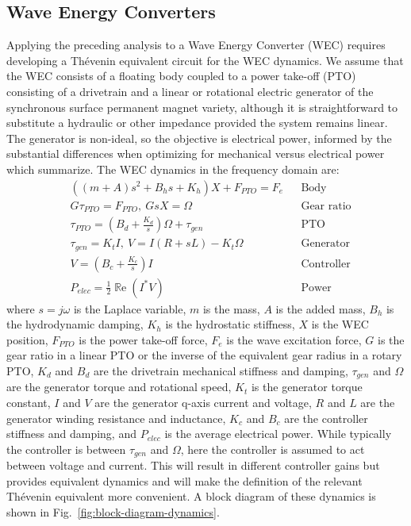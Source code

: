 \documentclass{ifacconf}
\renewcommand{\Re}{\operatorname{\mathbb{R}e}}
\begin{document}
\subsection{Wave Energy Converters}
Applying the preceding analysis to a Wave Energy Converter (WEC) requires developing a Thévenin equivalent circuit for the WEC dynamics. We assume that the WEC consists of a floating body coupled to a power take-off (PTO) consisting of a drivetrain and a linear or rotational electric generator of the synchronous surface permanent magnet variety, although it is straightforward to substitute a hydraulic or other impedance provided the system remains linear. The generator is non-ideal, so the objective is electrical power, informed by the substantial differences when optimizing for mechanical versus electrical power which \cite{coe_useful_2023} summarize. The WEC dynamics in the frequency domain are:
\begin{equation}\label{eq:wec-dynamics}
\begin{aligned}
    &((m+A)s^2 + B_h s + K_h) X + F_{PTO} = F_e &&\textrm{Body}\\
    &G \tau_{PTO} = F_{PTO},~G s X = \Omega &&\textrm{Gear ratio}\\
    &\tau_{PTO} = (B_d + \frac{K_d}{s}) \Omega + \tau_{gen} &&\textrm{PTO}\\
    &\tau_{gen} = K_t I,~V = I(R + s L) - K_t \Omega &&\textrm{Generator}\\
    &V = (B_c + \frac{K_c}{s}) I &&\textrm{Controller}\\
    &P_{elec} = \frac{1}{2} \Re(I^* V) &&\textrm{Power}
\end{aligned}
\end{equation}
where $s=j\omega$ is the Laplace variable, $m$ is the mass, $A$ is the added mass, $B_h$ is the hydrodynamic damping, $K_h$ is the hydrostatic stiffness, $X$ is the WEC position, $F_{PTO}$ is the power take-off force, $F_e$ is the wave excitation force, $G$ is the gear ratio in a linear PTO or the inverse of the equivalent gear radius in a rotary PTO, $K_d$ and $B_d$ are the drivetrain mechanical stiffness and damping, $\tau_{gen}$ and $\Omega$ are the generator torque and rotational speed, $K_t$ is the generator torque constant, $I$ and $V$ are the generator q-axis current and voltage, $R$ and $L$ are the generator winding resistance and inductance, $K_c$ and $B_c$ are the controller stiffness and damping, and $P_{elec}$ is the average electrical power. While typically the controller is between $\tau_{gen}$ and $\Omega$, here the controller is assumed to act between voltage and current. This will result in different controller gains but provides equivalent dynamics and will make the definition of the relevant Thévenin equivalent more convenient. A block diagram of these dynamics is shown in Fig.~\ref{fig:block-diagram-dynamics}.
\end{document}
